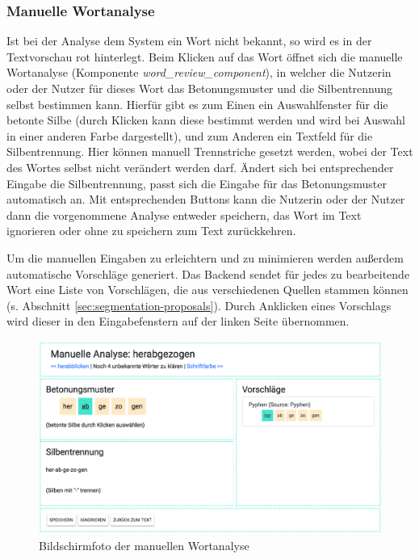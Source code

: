 \subsubsection{Manuelle Wortanalyse}
\label{sec:manuelleanalyse}

Ist bei der Analyse dem System ein Wort nicht bekannt, so wird es in der Textvorschau rot hinterlegt. Beim Klicken auf das Wort öffnet sich die manuelle Wortanalyse (Komponente \textit{word\_review\_component}), in welcher die Nutzerin oder der Nutzer für dieses Wort das Betonungsmuster und die Silbentrennung selbst bestimmen kann. Hierfür gibt es zum Einen ein Auswahlfenster für die betonte Silbe (durch Klicken kann diese bestimmt werden und wird bei Auswahl in einer anderen Farbe dargestellt), und zum Anderen ein Textfeld für die Silbentrennung. Hier können manuell Trennstriche gesetzt werden, wobei der Text des Wortes selbst nicht verändert werden darf. Ändert sich bei entsprechender Eingabe die Silbentrennung, passt sich die Eingabe für das Betonungsmuster automatisch an. Mit entsprechenden Buttons kann die Nutzerin oder der Nutzer dann die vorgenommene Analyse entweder speichern, das Wort im Text ignorieren oder ohne zu speichern zum Text zurückkehren.

Um die manuellen Eingaben zu erleichtern und zu minimieren werden außerdem automatische Vorschläge generiert. Das Backend sendet für jedes zu bearbeitende Wort eine Liste von Vorschlägen, die aus verschiedenen Quellen stammen können (s. Abschnitt \ref{sec:segmentation-proposals}). Durch Anklicken eines Vorschlags wird dieser in den Eingabefenstern auf der linken Seite übernommen.

\begin{figure}[h!]
	\centering
	\includegraphics[width=.8\linewidth]{figures/frontend/manuelle-analyse}
	\caption{Bildschirmfoto der manuellen Wortanalyse}
	\label{fig:frontend-manuelle-analyse}
\end{figure}

